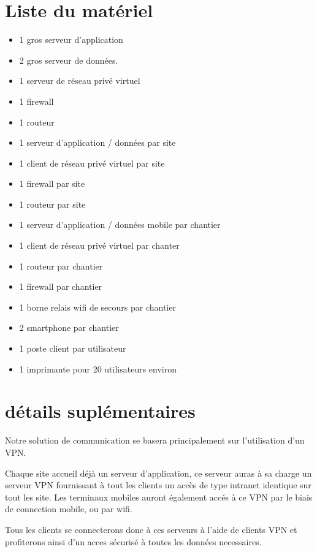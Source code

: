 \section{Liste du matériel}
\begin{itemize}
	\item 1 gros serveur d'application
	\item 2 gros serveur de données.
	\item 1 serveur de réseau privé virtuel
    \item 1 firewall
	\item 1 routeur 

	\item 1 serveur d'application / données par site
	\item 1 client de réseau privé virtuel par site
    \item 1 firewall par site
	\item 1 routeur par site

	\item 1 serveur d'application / données mobile par chantier
	\item 1 client de réseau privé virtuel par chanter
	\item 1 routeur par chantier
    \item 1 firewall par chantier
	\item 1 borne relais wifi de secours par chantier
	\item 2 smartphone par chantier

	\item 1 poste client par utilisateur
	\item 1 imprimante pour 20 utilisateurs environ
\end{itemize}

\section{détails suplémentaires}

    Notre solution de communication se basera principalement sur l'utilisation d'un VPN.

    Chaque site accueil déjà un serveur d'application, ce serveur auras à sa charge un serveur VPN fournissant à tout les clients un accès de type intranet identique sur tout les site.
    Les terminaux mobiles auront également accés à ce VPN par le biais de connection mobile, ou par wifi.

    Tous les clients se connecterons donc à ces serveurs à l'aide de clients VPN et profiterons ainsi d'un acces sécurisé à toutes les données necessaires.

